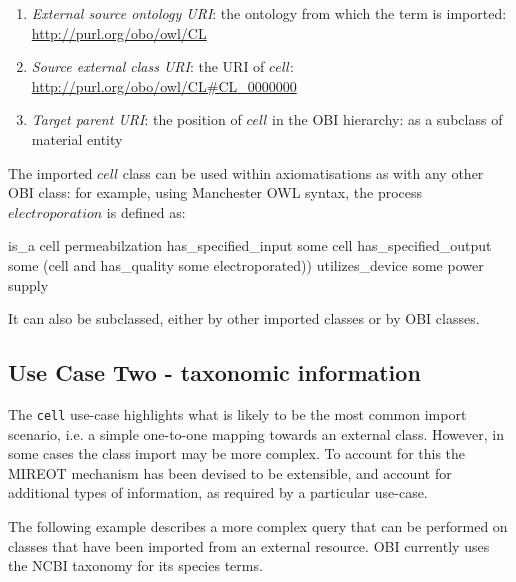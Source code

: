 \documentclass[a4paper,10pt,twocolumn]{article}
\begin{document}
\begin{enumerate}
\item \textit{External source ontology URI}: the ontology from which the term is imported: \url{http://purl.org/obo/owl/CL}
\item \textit{Source external class URI}: the URI of $cell$: \url{http://purl.org/obo/owl/CL#CL_0000000}
\item \textit{Target parent URI}: the position of $cell$ in the OBI hierarchy: as a subclass of material entity %




\end{enumerate}

The imported $cell$ class can be used within axiomatisations as with any other OBI class: for example, using Manchester OWL syntax, the process $electroporation$ is defined as:


\begin{footnotesize}
\begin{verbatimtab}
   is_a cell permeabilzation
   has_specified_input some cell
   has_specified_output some 
     (cell and has_quality some electroporated))
   utilizes_device some power supply
\end{verbatimtab}
\end{footnotesize}

It can also be subclassed, either by other imported classes or by OBI classes.
\subsection*{Use Case Two - taxonomic information}

The \texttt{cell} use-case highlights what is likely to be the most common import scenario, i.e. a simple one-to-one mapping towards an external class. 
However, in some cases the class import may be more complex. To account for this the MIREOT mechanism has been devised to be extensible, and account for additional types of information, as required by a particular use-case.

The following example describes a more complex query that can be performed on classes that have been imported from an external resource. 
OBI currently uses the NCBI taxonomy for its species terms.
\end{document}
